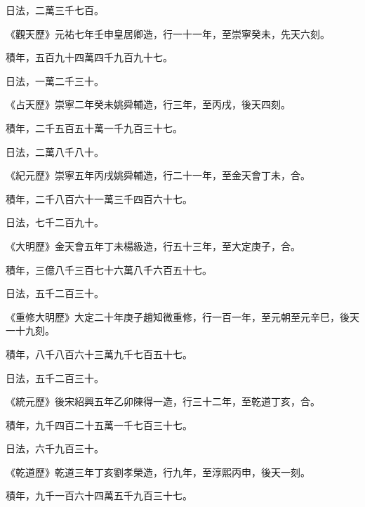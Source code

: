 \begin{pinyinscope}
 日法，二萬三千七百。



 《觀天歷》元祐七年壬申皇居卿造，行一十一年，至崇寧癸未，先天六刻。



 積年，五百九十四萬四千九百九十七。



 日法，一萬二千三十。



 《占天歷》崇寧二年癸未姚舜輔造，行三年，至丙戌，後天四刻。



 積年，二千五百五十萬一千九百三十七。



 日法，二萬八千八十。



 《紀元歷》崇寧五年丙戌姚舜輔造，行二十一年，至金天會丁未，合。



 積年，二千八百六十一萬三千四百六十七。



 日法，七千二百九十。



 《大明歷》金天會五年丁未楊級造，行五十三年，至大定庚子，合。



 積年，三億八千三百七十六萬八千六百五十七。



 日法，五千二百三十。



 《重修大明歷》大定二十年庚子趙知微重修，行一百一年，至元朝至元辛巳，後天一十九刻。



 積年，八千八百六十三萬九千七百五十七。



 日法，五千二百三十。



 《統元歷》後宋紹興五年乙卯陳得一造，行三十二年，至乾道丁亥，合。



 積年，九千四百二十五萬一千七百三十七。



 日法，六千九百三十。



 《乾道歷》乾道三年丁亥劉孝榮造，行九年，至淳熙丙申，後天一刻。



 積年，九千一百六十四萬五千九百三十七。




\end{pinyinscope}
